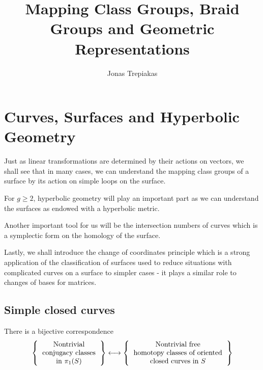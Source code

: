 \documentclass[reqno]{amsart}
\title{Mapping Class Groups, Braid Groups and Geometric Representations}
\author{Jonas Trepiakas}
\theoremstyle{definition}
\theoremstyle{remark}
\begin{document}
\maketitle

\tableofcontents

\section{Curves, Surfaces and Hyperbolic Geometry}

Just as linear transformations are determined by
their actions on vectors, we shall see
that in many cases, we can understand the mapping
class groups of a surface by its action on 
simple loops on the surface.

For $g \ge 2$, hyperbolic geometry will play an important part
as we can understand the surfaces as endowed with a
hyperbolic metric. 

Another important tool for us will be the intersection
numbers of curves which is a symplectic form
on the homology of the surface. 

Lastly, we shall introduce the change of coordinates
principle which is a strong application of
the classification of surfaces used to
reduce situations with complicated curves on a surface
to simpler cases - it plays a similar role to changes
of bases for matrices.

    \subsection{Simple closed curves}
There is a bijective correspondence
\[
\left\{ 
    \begin{tabular}{c}
    Nontrivial\\
    conjugacy classes\\
    in $\pi_1 (S)$
\end{tabular}
\right\} 
\longleftrightarrow
\left\{ 
    \begin{tabular}{c}
        Nontrivial free\\
        homotopy classes of oriented\\
        closed curves in $S$
\end{tabular}
\right\} 
\] 
\end{document}
